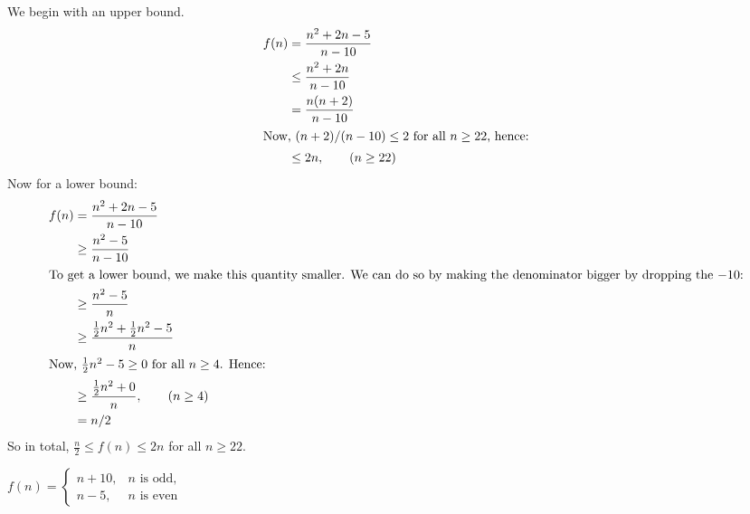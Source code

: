 \begin{prob}
\begin{subprobset}
\begin{subprob}
\begin{soln}
                We begin with an upper bound.
                \begin{align*}
                    f(n)
                    &=
                        \frac{n^2 + 2n - 5}{n - 10}
                        \\
                    &\leq
                        \frac{n^2 + 2n}{n - 10}
                        \\
                    &=
                        \frac{n(n + 2)}{n - 10}
                        \\
                        \intertext{Now, $(n+2)/(n-10) \leq 2$ for all $n \geq 22$, hence:}
                    &\leq
                        2 n, \qquad (n \geq 22)
                        \\
                \end{align*}
                Now for a lower bound:
                \begin{align*}
                    f(n)
                    &=
                        \frac{n^2 + 2n - 5}{n - 10}
                        \\
                    &\geq
                        \frac{n^2 - 5}{n - 10}
                        \\
                    \intertext{To get a lower bound, we make this
                    quantity smaller. We can do so by making the
                    denominator bigger by dropping the $-10$:}
                    &\geq
                        \frac{n^2 - 5}{n}
                        \\
                    &\geq
                    \frac{\frac{1}{2}n^2  + \frac{1}{2}n^2 - 5}{n}
                        \\
                        \intertext{Now, $\frac{1}{2}n^2 -5 \geq 0$ for all $n \geq 4$. Hence:}
                    &\geq
                \frac{\frac{1}{2}n^2  + 0}{n}, \qquad (n \geq 4)
                        \\
                    &= n/2
                \end{align*}
                So in total, $\frac{n}{2} \leq f(n) \leq 2n$ for all $n \geq 22$.
            \end{soln}
            
        \end{subprob}

        \begin{subprob}
            $
            \displaystyle
            f(n) = 
            \begin{cases}
                n + 10, & n \text{ is odd},\\
                n - 5, & n \text{ is even}
            \end{cases}
            $


\end{subprob}
\end{subprobset}
\end{prob}
